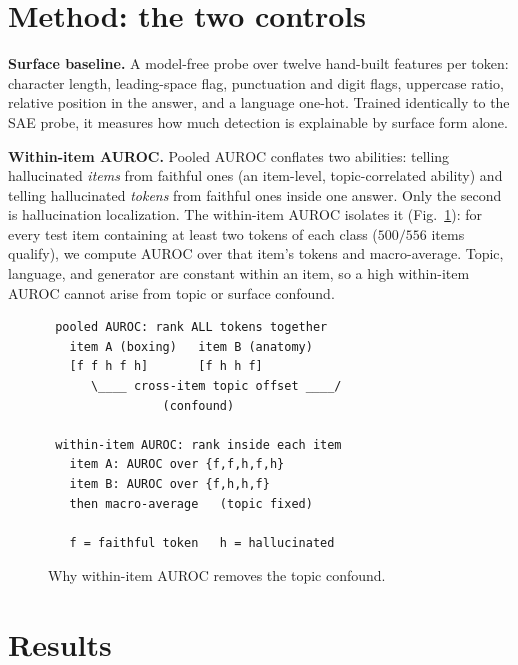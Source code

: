 \documentclass[conference]{IEEEtran}
\begin{document}
\section{Method: the two controls}
\textbf{Surface baseline.} A model-free probe over twelve hand-built features
per token: character length, leading-space flag, punctuation and digit flags,
uppercase ratio, relative position in the answer, and a language one-hot.
Trained identically to the SAE probe, it measures how much detection is
explainable by surface form alone.

\textbf{Within-item AUROC.} Pooled AUROC conflates two abilities: telling
hallucinated \emph{items} from faithful ones (an item-level, topic-correlated
ability) and telling hallucinated \emph{tokens} from faithful ones inside one
answer. Only the second is hallucination localization. The within-item AUROC
isolates it (Fig.~\ref{fig:within}): for every test item containing at least
two tokens of each class ($500/556$ items qualify), we compute AUROC over that
item's tokens and macro-average. Topic, language, and generator are constant
within an item, so a high within-item AUROC cannot arise from topic or surface
confound.

\begin{figure}[t]
\footnotesize
\begin{verbatim}
 pooled AUROC: rank ALL tokens together
   item A (boxing)   item B (anatomy)
   [f f h f h]       [f h h f]
      \____ cross-item topic offset ____/
                (confound)

 within-item AUROC: rank inside each item
   item A: AUROC over {f,f,h,f,h}
   item B: AUROC over {f,h,h,f}
   then macro-average   (topic fixed)

   f = faithful token   h = hallucinated
\end{verbatim}
\caption{Why within-item AUROC removes the topic confound.}
\label{fig:within}
\end{figure}

\section{Results}
\end{document}

